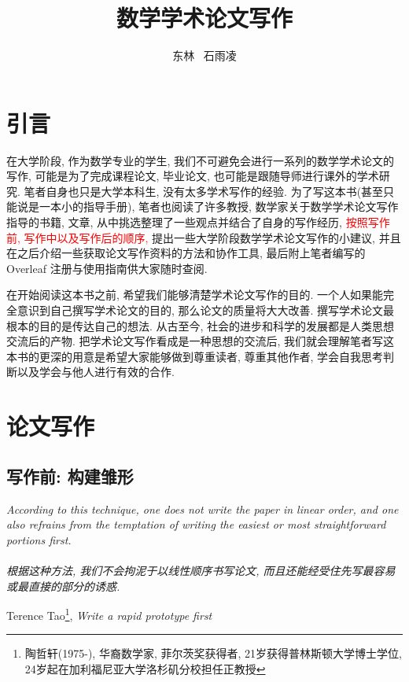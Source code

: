 \documentclass{formatBook}
\newcommand{\XG}[1]{\textcolor{red}{#1}}
\begin{document}
\title{数学学术论文写作}
\author{东林 \ 石雨凌}
\maketitle
\tableofcontents
\setlength{\parskip}{1.5em}
\newpage
\chapter{引言}
在大学阶段, 作为数学专业的学生, 我们不可避免会进行一系列的数学学术论文的写作, 可能是为了完成课程论文, 毕业论文, 也可能是跟随导师进行课外的学术研究. 笔者自身也只是大学本科生, 没有太多学术写作的经验. 为了写这本书(甚至只能说是一本小的指导手册), 笔者也阅读了许多教授, 数学家关于数学学术论文写作指导的书籍, 文章, 从中挑选整理了一些观点并结合了自身的写作经历, \XG{按照写作前, 写作中以及写作后的顺序, }提出一些大学阶段数学学术论文写作的小建议, 并且在之后介绍一些获取论文写作资料的方法和协作工具, 最后附上笔者编写的 Overleaf 注册与使用指南供大家随时查阅.

\par 在开始阅读这本书之前, 希望我们能够清楚学术论文写作的目的. 一个人如果能完全意识到自己撰写学术论文的目的, 那么论文的质量将大大改善. 撰写学术论文最根本的目的是传达自己的想法. 从古至今, 社会的进步和科学的发展都是人类思想交流后的产物. 把学术论文写作看成是一种思想的交流后, 我们就会理解笔者写这本书的更深的用意是希望大家能够做到尊重读者, 尊重其他作者, 学会自我思考判断以及学会与他人进行有效的合作.

\chapter{论文写作}
\section{写作前: 构建雏形}
\setlength{\parskip}{1em}
\noindent \textit{According to this technique, one does not write the paper in linear order, and one also refrains from the temptation of writing the easiest or most straightforward portions first. \\ \ \\ 根据这种方法, 我们不会拘泥于以线性顺序书写论文, 而且还能经受住先写最容易或最直接的部分的诱惑. }
\begin{flushright}
    \cndash Terence Tao\footnote{陶哲轩(1975-), 华裔数学家, 菲尔茨奖获得者, 21岁获得普林斯顿大学博士学位,  24岁起在加利福尼亚大学洛杉矶分校担任正教授}, \textit{Write a rapid prototype first\cite{TaoWrite2007}}
\end{flushright}
\setlength{\parskip}{1.5em}
\end{document}
